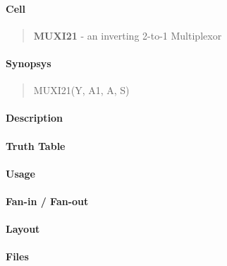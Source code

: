 \label{MUXI21}
\paragraph{Cell}
\begin{quote}
    \textbf{MUXI21} - an inverting 2-to-1 Multiplexor
\end{quote}

\paragraph{Synopsys}
\begin{quote}
    MUXI21(Y, A1, A, S)
\end{quote}

\paragraph{Description}



\paragraph{Truth Table}


\paragraph{Usage}

\paragraph{Fan-in / Fan-out}

\paragraph{Layout}

\paragraph{Files}
%
